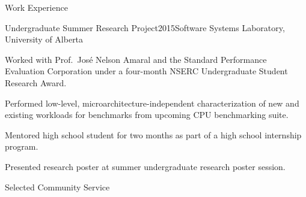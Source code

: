 \documentclass{cv}
\begin{document}
\begin{rSection}{Work Experience}
\begin{rSubsection}{Undergraduate Summer Research Project}{2015}{Software Systems Laboratory, University of Alberta}
\item Worked with Prof.~Jos{\'{e}} Nelson Amaral and the Standard Performance Evaluation Corporation under a four-month NSERC Undergraduate Student Research Award.
\item Performed low-level, microarchitecture-independent characterization of new and existing workloads for benchmarks from upcoming CPU benchmarking suite.
\item Mentored high school student for two months as part of a high school internship program.
\item Presented research poster at summer undergraduate research poster session.
\end{rSubsection}

\end{rSection}


\begin{rSection}{Selected Community Service}

 \vspace{0.15em}\\
 \vspace{0.15em}\\
 \vspace{0.15em}\\
 \vspace{0.15em}\\
 \vspace{0.15em}\\
 \vspace{0.15em}\\
 \vspace{0.15em}\\
 \vspace{0.15em}

\end{rSection}
\end{document}
